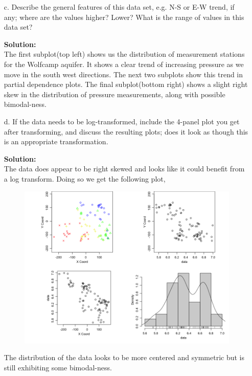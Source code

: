 \documentclass[12pt]{article}
\makeatletter
\theoremstyle{homework}
\newenvironment{exercise}[1]
{\def\@currentlabel{#1}\exercisecore}
{\endexercisecore}
\newcommand{\localhead}[1]{\par\smallskip\noindent\textbf{#1}\nobreak\\}%
\newcommand\solution{\localhead{Solution:}}
\makeatother
\begin{document}
\begin{exercise}{4}
\begin{enumerate}
    \item[c.]Describe the general features of this data set, e.g. N-S or E-W trend, if any; where are the values higher? Lower? What is the range of values in this 
        data set?\\ 
      \solution The first subplot(top left) shows us the distribution of measurement stations for the Wolfcamp aquifer. It shows a clear trend of increasing pressure as we move 
      in the south west directions. The next two subplots show this trend in partial dependence plots. The final subplot(bottom right) shows a slight right skew in the distribution of 
      pressure measurements, along with possible bimodal-ness. 

      \item[d.] If the data needs to be log-transformed, include the 4-panel plot you get after transforming, and discuss the resulting plots; does it look as though this is an appropriate transformation.\\
      \solution The data does appear to be right skewed and looks like it could benefit from a log transform. Doing so we get the following plot, 
      \begin{figure}[H]
        \begin{center}
        \includegraphics[width = \textwidth]{Rplot03.png}
        \end{center}
      \end{figure}
      The distribution of the data looks to be more centered and symmetric but is still exhibiting some bimodal-ness. 
  \end{enumerate}
\end{exercise}
\vspace{1in}
\end{document}
